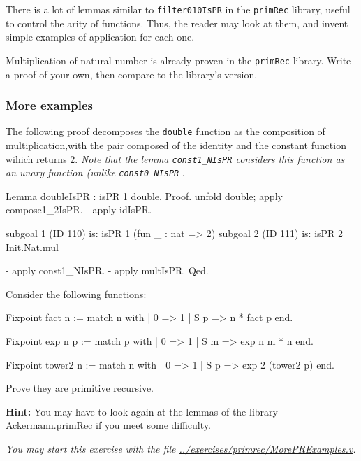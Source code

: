 \begin{exercise}
There is a lot of lemmas similar to \texttt{filter010IsPR} in the \texttt{primRec} library, useful to control the arity of functions.
Thus, the reader may look at them, and invent simple examples of application for each one.
\end{exercise}

\begin{exercise}
Multiplication of natural number is already proven in the \texttt{primRec} library. Write a proof of your own, then compare to the library's version.
\end{exercise}

\subsubsection{More examples}

The following proof decomposes the \texttt{double} function as the composition of 
multiplication,with the pair composed of the identity and the constant function wihich returns $2$.
\emph{Note that the lemma \texttt{const1\_NIsPR} considers this function as an unary function (unlike \texttt{const0\_NIsPR} }. 

\begin{Coqsrc}
Lemma doubleIsPR : isPR 1 double.
Proof.
  unfold double; apply compose1_2IsPR.
  - apply idIsPR.
\end{Coqsrc}

\begin{Coqanswer}
subgoal 1 (ID 110) is:
 isPR 1 (fun _ : nat => 2)
subgoal 2 (ID 111) is:
 isPR 2 Init.Nat.mul
\end{Coqanswer}

 \begin{Coqsrc}
  - apply const1_NIsPR.
  - apply multIsPR.
Qed.
\end{Coqsrc}

\begin{exercise}
Consider the following functions:

\begin{Coqsrc}
Fixpoint fact n :=
  match n with 
          | 0 => 1
          | S p  => n * fact p
  end.

Fixpoint exp n p :=
  match p with
  | 0 => 1
  | S m =>  exp n m * n
  end.

Fixpoint tower2 n :=
  match n with
  | 0 => 1
  | S p => exp 2 (tower2 p)
  end.
\end{Coqsrc}

Prove they are primitive recursive.

\textbf{Hint:} You may have to look again at the lemmas of the library
\href{../theories/html/hydras.Ackermann.primRec.html}{Ackermann.primRec} if you meet some difficulty.

\emph{You may start this exercise with the file
\url{../exercises/primrec/MorePRExamples.v}.}
\end{exercise}







